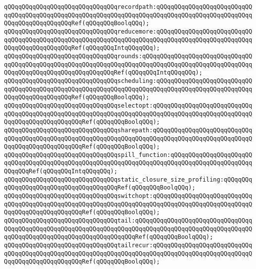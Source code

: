 \verb|qQQqqQQqqQQqqQQqqQQqqQQqqQQqqQQqrecordpath:qQQqqQQqqQQqqQQqqQQqqQQqqQQqqQQqqQQqqQQqqQQqqQQqqQQqqQQqqQQqqQQqqQQqqQQqqQQqqQQqqQQqqQQqqQQqqQQqqQQqqQQqqQQqqQQqqQQqRef(qQQqqQQqBoolqQQq);|\newline
\newline
\verb|qQQqqQQqqQQqqQQqqQQqqQQqqQQqqQQqreducemore:qQQqqQQqqQQqqQQqqQQqqQQqqQQqqQQqqQQqqQQqqQQqqQQqqQQqqQQqqQQqqQQqqQQqqQQqqQQqqQQqqQQqqQQqqQQqqQQqqQQqqQQqqQQqqQQqqQQqRef(qQQqqQQqIntqQQqqQQq);|\newline
\verb|qQQqqQQqqQQqqQQqqQQqqQQqqQQqqQQqrounds:qQQqqQQqqQQqqQQqqQQqqQQqqQQqqQQqqQQqqQQqqQQqqQQqqQQqqQQqqQQqqQQqqQQqqQQqqQQqqQQqqQQqqQQqqQQqqQQqqQQqqQQqqQQqqQQqqQQqqQQqqQQqqQQqqQQqRef(qQQqqQQqIntqQQqqQQq);|\newline
\newline
\verb|qQQqqQQqqQQqqQQqqQQqqQQqqQQqqQQqscheduling:qQQqqQQqqQQqqQQqqQQqqQQqqQQqqQQqqQQqqQQqqQQqqQQqqQQqqQQqqQQqqQQqqQQqqQQqqQQqqQQqqQQqqQQqqQQqqQQqqQQqqQQqqQQqqQQqqQQqRef(qQQqqQQqBoolqQQq);|\newline
\verb|qQQqqQQqqQQqqQQqqQQqqQQqqQQqqQQqselectopt:qQQqqQQqqQQqqQQqqQQqqQQqqQQqqQQqqQQqqQQqqQQqqQQqqQQqqQQqqQQqqQQqqQQqqQQqqQQqqQQqqQQqqQQqqQQqqQQqqQQqqQQqqQQqqQQqqQQqqQQqRef(qQQqqQQqBoolqQQq);|\newline
\verb|qQQqqQQqqQQqqQQqqQQqqQQqqQQqqQQqsharepath:qQQqqQQqqQQqqQQqqQQqqQQqqQQqqQQqqQQqqQQqqQQqqQQqqQQqqQQqqQQqqQQqqQQqqQQqqQQqqQQqqQQqqQQqqQQqqQQqqQQqqQQqqQQqqQQqqQQqqQQqRef(qQQqqQQqBoolqQQq);|\newline
\newline
\verb|qQQqqQQqqQQqqQQqqQQqqQQqqQQqqQQqspill_function:qQQqqQQqqQQqqQQqqQQqqQQqqQQqqQQqqQQqqQQqqQQqqQQqqQQqqQQqqQQqqQQqqQQqqQQqqQQqqQQqqQQqqQQqqQQqqQQqqQQqRef(qQQqqQQqIntqQQqqQQq);|\newline
\newline
\verb|qQQqqQQqqQQqqQQqqQQqqQQqqQQqqQQqstatic_closure_size_profiling:qQQqqQQqqQQqqQQqqQQqqQQqqQQqqQQqqQQqqQQqRef(qQQqqQQqBoolqQQq);|\newline
\verb|qQQqqQQqqQQqqQQqqQQqqQQqqQQqqQQqswitchopt:qQQqqQQqqQQqqQQqqQQqqQQqqQQqqQQqqQQqqQQqqQQqqQQqqQQqqQQqqQQqqQQqqQQqqQQqqQQqqQQqqQQqqQQqqQQqqQQqqQQqqQQqqQQqqQQqqQQqqQQqRef(qQQqqQQqBoolqQQq);|\newline
\verb|qQQqqQQqqQQqqQQqqQQqqQQqqQQqqQQqtail:qQQqqQQqqQQqqQQqqQQqqQQqqQQqqQQqqQQqqQQqqQQqqQQqqQQqqQQqqQQqqQQqqQQqqQQqqQQqqQQqqQQqqQQqqQQqqQQqqQQqqQQqqQQqqQQqqQQqqQQqqQQqqQQqqQQqqQQqqQQqRef(qQQqqQQqBoolqQQq);|\newline
\verb|qQQqqQQqqQQqqQQqqQQqqQQqqQQqqQQqtailrecur:qQQqqQQqqQQqqQQqqQQqqQQqqQQqqQQqqQQqqQQqqQQqqQQqqQQqqQQqqQQqqQQqqQQqqQQqqQQqqQQqqQQqqQQqqQQqqQQqqQQqqQQqqQQqqQQqqQQqqQQqRef(qQQqqQQqBoolqQQq);|\newline
